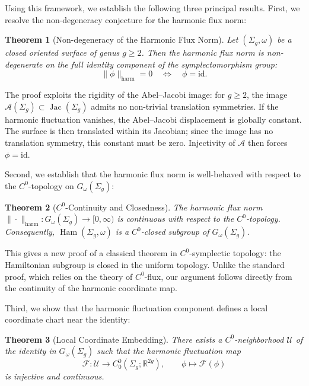 \documentclass[11pt]{article}
\newtheorem{theorem}{Theorem}[section]
\theoremstyle{definition}
\begin{document}
	\medskip\noindent
	Using this framework, we establish the following three principal results. First, we resolve the non-degeneracy conjecture for the harmonic flux norm:
	
	\begin{theorem}[Non-degeneracy of the Harmonic Flux Norm]
		\label{thm:intro_nondeg}
		Let $(\Sigma_g,\omega)$ be a closed oriented surface of genus $g\ge2$. Then the harmonic flux norm is non-degenerate on the full identity component of the symplectomorphism group:
		\[
		\|\phi\|_{\mathrm{harm}}=0 \quad\Longleftrightarrow\quad \phi=\mathrm{id}.
		\]
	\end{theorem}
	
	The proof exploits the rigidity of the Abel--Jacobi image: for $g\ge2$, the image $\mathcal A(\Sigma_g)\subset \operatorname{Jac}(\Sigma_g)$ admits no non-trivial translation symmetries. If the harmonic fluctuation vanishes, the Abel--Jacobi displacement is globally constant. The surface is then translated within its Jacobian; since the image has no translation symmetry, this constant must be zero. Injectivity of $\mathcal A$ then forces $\phi=\mathrm{id}$.
	
	Second, we establish that the harmonic flux norm is well-behaved with respect to the $C^0$-topology on $G_\omega(\Sigma_g)$:
	
	\begin{theorem}[$C^0$-Continuity and Closedness]
		\label{thm:intro_continuity}
		The harmonic flux norm $\|\cdot\|_{\mathrm{harm}}: G_\omega(\Sigma_g) \longrightarrow [0,\infty)$ is continuous with respect to the $C^0$-topology. Consequently, $\operatorname{Ham}(\Sigma_g,\omega)$ is a $C^0$-closed subgroup of $G_\omega(\Sigma_g)$.
	\end{theorem}
	
	This gives a new proof of a classical theorem in $C^0$-symplectic topology: the Hamiltonian subgroup is closed in the uniform topology. Unlike the standard proof, which relies on the theory of $C^0$-flux, our argument follows directly from the continuity of the harmonic coordinate map.
	
	Third, we show that the harmonic fluctuation component defines a local coordinate chart near the identity:
	
	\begin{theorem}[Local Coordinate Embedding]
		\label{thm:intro_injectivity}
		There exists a $C^0$-neighborhood $\mathcal{U}$ of the identity in $G_\omega(\Sigma_g)$ such that the harmonic fluctuation map
		\[
		\mathcal{F}: \mathcal{U} \longrightarrow C^0_0(\Sigma_g; \mathbb{R}^{2g}), \qquad \phi \mapsto \mathcal{F}(\phi)
		\]
		is injective and continuous.
	\end{theorem}
	
\end{document}
